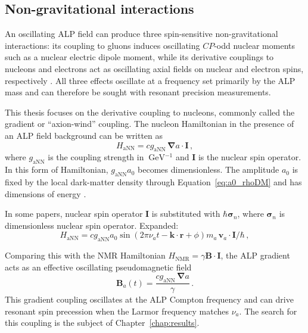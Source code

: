 \subsection{Non-gravitational interactions}
An oscillating ALP field can produce three spin-sensitive non-gravitational interactions: its coupling to gluons induces oscillating $CP$-odd nuclear moments such as a nuclear electric dipole moment, while its derivative couplings to nucleons and electrons act as oscillating axial fields on nuclear and electron spins, respectively \cite{GrahamNewobservables}.
All three effects oscillate at a frequency set primarily by the ALP mass and can therefore be sought with resonant precision measurements.

This thesis focuses on the derivative coupling to nucleons, commonly called the gradient or ``axion-wind'' coupling.
The nucleon Hamiltonian in the presence of an ALP field background can be written as
\begin{equation}
    H_{\mathrm{aNN}} = c g_{\mathrm{aNN}}\,{\boldsymbol\nabla}a\cdot\mathbf{I}
    \,,\label{eq:HaNN}
\end{equation}
where $g_{\mathrm{aNN}}$ is the coupling strength in $\SI{}{\GeV^{-1}}$ and $\mathbf{I}$ is the nuclear spin operator.
In this form of Hamiltonian, $g_{\mathrm{aNN}} a_0$ becomes dimensionless.
The amplitude $a_0$ is fixed by the local dark-matter density through Equation~\eqref{eq:a0_rhoDM} and has dimensions of energy \cite{BERGSTROM1998137,Jungman1992SupersymmetricDM,doi:10.1146/annurev.astro.39.1.137}.


In some papers, nuclear spin operator $\mathbf{I}$ is substituted with $\hbar {\boldsymbol\sigma_n}$, where $ {\boldsymbol\sigma_n}$ is dimensionless nuclear spin operator.
Expanded:
\begin{equation}
    H_{\mathrm{aNN}} = c g_{\mathrm{aNN}} a_0
    \sin(2\pi\nu_a t - \mathbf{k}\cdot\mathbf{r} + \phi)
    m_a \,\mathbf{v}_a\cdot\mathbf{I}/ \hbar
    \,,\label{eq:HaNN_vel}
\end{equation}

Comparing this with the NMR Hamiltonian $H_\mathrm{NMR} = \gamma\mathbf{B}\cdot\mathbf{I}$, the ALP gradient acts as an effective oscillating pseudomagnetic field
\begin{equation}
    \mathbf{B}_a(t) = \frac{c g_{\mathrm{aNN}}\,{\boldsymbol\nabla}a}{\gamma}
    \,.\label{eq:Bpseudo}
\end{equation}
This gradient coupling oscillates at the ALP Compton frequency and can drive resonant spin precession when the Larmor frequency matches $\nu_a$.
The search for this coupling is the subject of Chapter~\ref{chap:results}.

